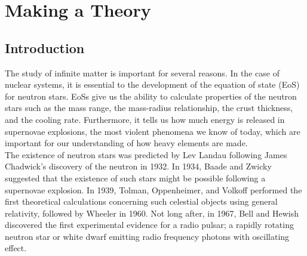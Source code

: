 \documentclass[10pt,twoside]{report}
\begin{document}
		\tableofcontents
		\newpage
	
	\part{Making a Theory}
	
	\fancyhead[RE,LO]{\nouppercase{\rightmark}}
	\fancyhead[LO]{\nouppercase{\leftmark}}
	\fancyfoot[C]{\thepage}
	
	\chapter{Introduction}
	The study of infinite matter is important for several reasons. In the case of nuclear systems, it is essential to the development of the equation of state (EoS) for neutron stars. EoSs give us the ability to calculate properties of the neutron stars such as the mass range, the mass-radius relationship, the crust thickness, and the cooling rate. Furthermore, it tells us how much energy is released in supernovae explosions, the most violent phenomena we know of today, which are important for our understanding of how heavy elements are made.\\
	
	The existence of neutron stars was \cite{MHjorthJensenHeiselberg00} predicted by Lev Landau following James Chadwick's discovery of the neutron in 1932. In 1934, Baade and Zwicky suggested that the existence of such stars might be possible following a supernovae explosion. In 1939, Tolman, Oppenheimer, and Volkoff performed the first theoretical calculations concerning such celestial objects using general relativity, followed by Wheeler in 1960. Not long after, in 1967, Bell and Hewish discovered the first experimental evidence for a radio pulsar; a rapidly rotating neutron star or white dwarf emitting radio frequency photons with oscillating effect.\\
	
\end{document}
